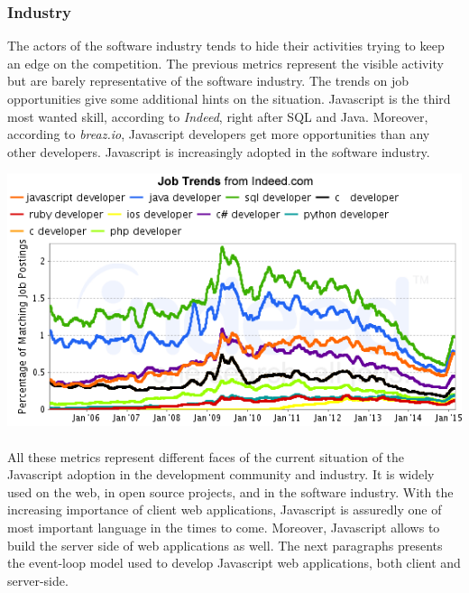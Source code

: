 \subsubsection{Industry}

The actors of the software industry tends to hide their activities trying to keep an edge on the competition.
The previous metrics represent the visible activity but are barely representative of the software industry.
The trends on job opportunities give some additional hints on the situation.
Javascript is the third most wanted skill, according to \textit{Indeed}, right after SQL and Java.
Moreover, according to \textit{breaz.io}, Javascript developers get more opportunities than any other developers.
Javascript is increasingly adopted in the software industry.

\includegraphics[width=0.9\linewidth]{../../data/js-trends/jobgraph}

\paragraph{}

All these metrics represent different faces of the current situation of the Javascript adoption in the development community and industry.
It is widely used on the web, in open source projects, and in the software industry.
With the increasing importance of client web applications, Javascript is assuredly one of most important language in the times to come.
Moreover, Javascript allows to build the server side of web applications as well.
The next paragraphs presents the event-loop model used to develop Javascript web applications, both client and server-side.



